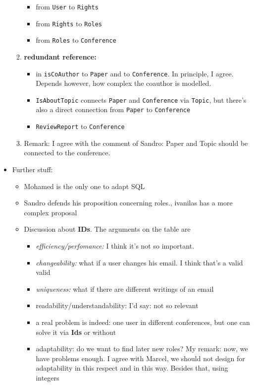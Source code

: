 \documentclass[11pt,handout,nologo]{handout}
\begin{document}
\begin{itemize}
\begin{enumerate}
\begin{itemize}
  \item from \texttt{User} to \texttt{Rights}
  \item from \texttt{Rights} to \texttt{Roles}
  \item from \texttt{Roles} to \texttt{Conference}
  \end{itemize}
\item \textbf{redundant reference:} 
  \begin{itemize}
  \item  in \texttt{isCoAuthor} to \texttt{Paper}
    and to \texttt{Conference}. In principle, I agree. Depends however, how
    complex the coauthor is modelled.
  \item \texttt{IsAboutTopic} connects \texttt{Paper} and \texttt{Conference}
    via \texttt{Topic}, but there's also a direct connection from \texttt{Paper}
    to \texttt{Conference}
  \item \texttt{ReviewReport} to \texttt{Conference}
  \end{itemize}
\item Remark: I agree with the comment of Sandro: Paper and Topic should be
  connected to the conference.
\end{enumerate}
\item Further stuff:
  \begin{itemize}
  \item Mohamed is the only one to adapt SQL
  \item Sandro defends his proposition concerning roles., ivanilas  has a more
  complex proposal
\item Discussion about \textbf{IDs}. The arguments on the table are
  \begin{itemize}
  \item \emph{efficiency/perfomance:} I think it's not so important.
  \item \emph{changeability:} what if a user changes his email. I think that's
    a valid valid
  \item \emph{uniqueness:} what if there are different writings of an email
  \item \textrm{readability/understandability:} I'd say: not so relevant
  \item a real problem is indeed: one user in different conferences, but one
    can solve it via \textbf{Ids} or without
  \item adaptability: do we want to find later new roles? My remark: now, we
    have problems enough. I agree with Marcel, we should not design for
    adaptability in this respect and in this way. Besides that, using integers

\end{itemize}
\end{itemize}
\end{itemize}
\end{document}
